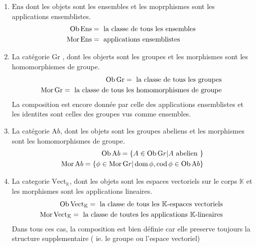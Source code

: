 \documentclass[../main.tex]{subfiles}
\begin{document}
\begin{enumerate}
\item $ \mathrm { Ens} $ dont les objets sont les ensembles et les moprphismes sont les applications ensemblistes.
	\begin{align*}
		\operatorname{Ob} \mathrm { Ens} &= \text{ la classe de tous les ensembles } \\
		\operatorname{Mor} \mathrm { Ens} &= \text{ applications ensemblistes } 
	\end{align*}

\item La catégorie $ \mathrm { Gr} $ , dont les objerts sont les groupes et les morphismes sont les homomorphismes de groupe.
	\begin{align*}
\operatorname{Ob} \mathrm { Gr} = \text{ la classe de tous les groupes }\\
\operatorname{Mor} \mathrm { Gr} = \text{ la classe de tous les homomorphismes de groupe } 
	\end{align*}
La composition est encore donnée par celle des applications ensemblistes et les identites sont celles des groupes vus comme ensembles.
\item La catégorie $\mathrm Ab$, dont les objets sont les groupes abeliens et les morphismes sont les homomorphismes de groupe.
	\begin{align*}
	\operatorname{Ob} \mathrm Ab = \left\{ A \in \operatorname{Ob} \mathrm Gr | A \text{ abelien }  \right\} \\
	\operatorname{Mor} \mathrm Ab = \left\{ \phi \in \operatorname{Mor} \mathrm Gr | \operatorname{dom} \phi , \operatorname{cod}  \phi \in \operatorname{Ob} \mathrm Ab \right\} 
	\end{align*}

\item La categorie $ \mathrm { Vect _{ \mathbb{K}} } $, dont les objets sont les espaces vectoriels sur le corps $ \mathbb{K}$ et les morphismes sont les applications lineaires.
	\begin{align*}
	\operatorname{Ob} \mathrm { Vect_{\mathbb{K}}  }= \text{ la classe de tous les $\mathbb{K}$-espaces vectoriels }  \\
	\operatorname{Mor} \mathrm { Vect _{\mathbb{K}} } = \text{ la classe de toutes les applications $ \mathbb{K}$-lineaires  }	  
	\end{align*}
	Dans tous ces cas, la composition est bien définie car elle preserve toujours la structure supplementaire ( ie. le groupe ou l'espace vectoriel)
	

\end{enumerate}
\end{document}

